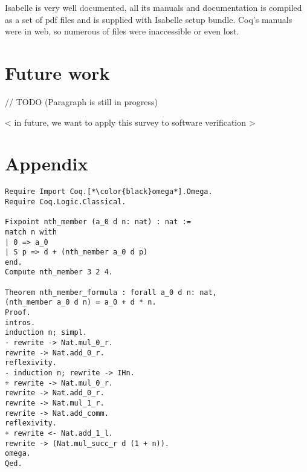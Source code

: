 \documentclass[article]{aaltoseries}
\begin{document}
Isabelle is very well documented, all its manuals and documentation is compiled as a set of pdf files and is supplied with Isabelle setup bundle. Coq's manuals were in web, so numerous of files were inaccessible or even lost.





\section{Future work}
\label{sec:future_work}

// TODO (Paragraph is still in progress)

< in future, we want to apply this survey to software verification >


\section{Appendix}

\begin{lstlisting}[language=coq,caption={First-order logic proof: formula of the sum of n first members of arithmetic progression}]
Require Import Coq.[*\color{black}omega*].Omega.
Require Coq.Logic.Classical.

Fixpoint nth_member (a_0 d n: nat) : nat :=
match n with
| 0 => a_0
| S p => d + (nth_member a_0 d p)
end.
Compute nth_member 3 2 4.

Theorem nth_member_formula : forall a_0 d n: nat,
(nth_member a_0 d n) = a_0 + d * n.
Proof.
intros.
induction n; simpl.
- rewrite -> Nat.mul_0_r.
rewrite -> Nat.add_0_r.
reflexivity.
- induction n; rewrite -> IHn.
+ rewrite -> Nat.mul_0_r.
rewrite -> Nat.add_0_r.
rewrite -> Nat.mul_1_r.
rewrite -> Nat.add_comm.
reflexivity.
+ rewrite <- Nat.add_1_l.
rewrite -> (Nat.mul_succ_r d (1 + n)).
omega.
Qed.

\end{lstlisting}




\end{document}
